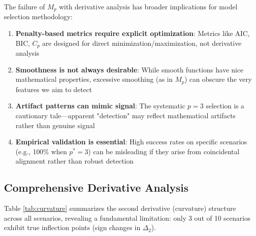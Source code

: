 \documentclass[11pt,a4paper]{article}
\begin{document}
The failure of $M_p$ with derivative analysis has broader implications for model selection methodology:

\begin{enumerate}
\item \textbf{Penalty-based metrics require explicit optimization}: Metrics like AIC, BIC, $C_p$ are designed for direct minimization/maximization, not derivative analysis

\item \textbf{Smoothness is not always desirable}: While smooth functions have nice mathematical properties, excessive smoothing (as in $M_p$) can obscure the very features we aim to detect

\item \textbf{Artifact patterns can mimic signal}: The systematic $p = 3$ selection is a cautionary tale—apparent "detection" may reflect mathematical artifacts rather than genuine signal

\item \textbf{Empirical validation is essential}: High success rates on specific scenarios (e.g., 100\% when $p^* = 3$) can be misleading if they arise from coincidental alignment rather than robust detection
\end{enumerate}

\subsection{Comprehensive Derivative Analysis}

Table \ref{tab:curvature} summarizes the second derivative (curvature) structure across all scenarios, revealing a fundamental limitation: only 3 out of 10 scenarios exhibit true inflection points (sign changes in $\Delta_2$).
\end{document}
